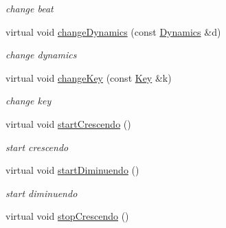 \begin{DoxyCompactItemize}
\begin{DoxyCompactList}\small\item\em change beat \end{DoxyCompactList}\item 
\hypertarget{classsinsy_1_1LabelMaker_aad6773bea2306fc1e6fab5993d090f88}{virtual void \hyperlink{classsinsy_1_1LabelMaker_aad6773bea2306fc1e6fab5993d090f88}{change\-Dynamics} (const \hyperlink{classsinsy_1_1Dynamics}{\-Dynamics} \&d)}\label{classsinsy_1_1LabelMaker_aad6773bea2306fc1e6fab5993d090f88}

\begin{DoxyCompactList}\small\item\em change dynamics \end{DoxyCompactList}\item 
\hypertarget{classsinsy_1_1LabelMaker_ae848767fe7964e6d890ea5f739bd8638}{virtual void \hyperlink{classsinsy_1_1LabelMaker_ae848767fe7964e6d890ea5f739bd8638}{change\-Key} (const \hyperlink{classsinsy_1_1Key}{\-Key} \&k)}\label{classsinsy_1_1LabelMaker_ae848767fe7964e6d890ea5f739bd8638}

\begin{DoxyCompactList}\small\item\em change key \end{DoxyCompactList}\item 
\hypertarget{classsinsy_1_1LabelMaker_aae52e30f45a9e50d19e0d7ee3ccf9035}{virtual void \hyperlink{classsinsy_1_1LabelMaker_aae52e30f45a9e50d19e0d7ee3ccf9035}{start\-Crescendo} ()}\label{classsinsy_1_1LabelMaker_aae52e30f45a9e50d19e0d7ee3ccf9035}

\begin{DoxyCompactList}\small\item\em start crescendo \end{DoxyCompactList}\item 
\hypertarget{classsinsy_1_1LabelMaker_a8bd2cef4cbd551739b7973c570d6b70f}{virtual void \hyperlink{classsinsy_1_1LabelMaker_a8bd2cef4cbd551739b7973c570d6b70f}{start\-Diminuendo} ()}\label{classsinsy_1_1LabelMaker_a8bd2cef4cbd551739b7973c570d6b70f}

\begin{DoxyCompactList}\small\item\em start diminuendo \end{DoxyCompactList}\item 
\hypertarget{classsinsy_1_1LabelMaker_a8bc2f4dd586aa8e89cb790560e1b9c01}{virtual void \hyperlink{classsinsy_1_1LabelMaker_a8bc2f4dd586aa8e89cb790560e1b9c01}{stop\-Crescendo} ()}\label{classsinsy_1_1LabelMaker_a8bc2f4dd586aa8e89cb790560e1b9c01}


\end{DoxyCompactItemize}
